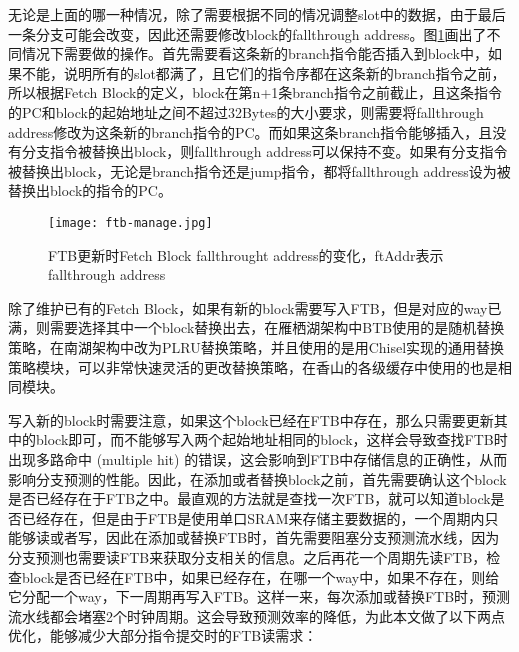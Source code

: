 
无论是上面的哪一种情况，除了需要根据不同的情况调整slot中的数据，由于最后一条分支可能会改变，因此还需要修改block的fallthrough address。图\ref{fig:figure32}画出了不同情况下需要做的操作。首先需要看这条新的branch指令能否插入到block中，如果不能，说明所有的slot都满了，且它们的指令序都在这条新的branch指令之前，所以根据Fetch Block的定义，block在第n+1条branch指令之前截止，且这条指令的PC和block的起始地址之间不超过32Bytes的大小要求，则需要将fallthrough address修改为这条新的branch指令的PC。而如果这条branch指令能够插入，且没有分支指令被替换出block，则fallthrough address可以保持不变。如果有分支指令被替换出block，无论是branch指令还是jump指令，都将fallthrough address设为被替换出block的指令的PC。

\begin{figure}[htb]
	\centering
	\setlength\tabcolsep{3pt}  %
	\vspace{5pt} %
	\texttt{[image: ftb-manage.jpg]}
	\caption{FTB更新时Fetch Block fallthrought address的变化，ftAddr表示fallthrough address}
	\label{fig:figure32}
\end{figure}

除了维护已有的Fetch Block，如果有新的block需要写入FTB，但是对应的way已满，则需要选择其中一个block替换出去，在雁栖湖架构中BTB使用的是随机替换策略，在南湖架构中改为PLRU替换策略，并且使用的是用Chisel实现的通用替换策略模块，可以非常快速灵活的更改替换策略，在香山的各级缓存中使用的也是相同模块。

写入新的block时需要注意，如果这个block已经在FTB中存在，那么只需要更新其中的block即可，而不能够写入两个起始地址相同的block，这样会导致查找FTB时出现多路命中 (multiple hit) 的错误，这会影响到FTB中存储信息的正确性，从而影响分支预测的性能。因此，在添加或者替换block之前，首先需要确认这个block是否已经存在于FTB之中。最直观的方法就是查找一次FTB，就可以知道block是否已经存在，但是由于FTB是使用单口SRAM来存储主要数据的，一个周期内只能够读或者写，因此在添加或替换FTB时，首先需要阻塞分支预测流水线，因为分支预测也需要读FTB来获取分支相关的信息。之后再花一个周期先读FTB，检查block是否已经在FTB中，如果已经存在，在哪一个way中，如果不存在，则给它分配一个way，下一周期再写入FTB。这样一来，每次添加或替换FTB时，预测流水线都会堵塞2个时钟周期。这会导致预测效率的降低，为此本文做了以下两点优化，能够减少大部分指令提交时的FTB读需求：

